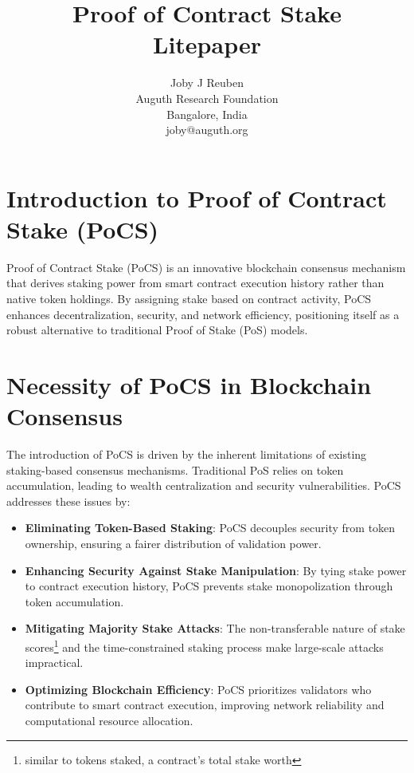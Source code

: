 \documentclass{article}
\begin{document}
\title{Proof of Contract Stake \\ Litepaper}

\author{Joby J Reuben \\
Auguth Research Foundation \\
Bangalore, India \\
joby@auguth.org
}

\maketitle

\section{Introduction to Proof of Contract Stake (PoCS)}

Proof of Contract Stake (PoCS) is an innovative blockchain consensus mechanism that derives staking power from smart contract execution history rather than native token holdings. By assigning stake based on contract activity, PoCS enhances decentralization, security, and network efficiency, positioning itself as a robust alternative to traditional Proof of Stake (PoS) models.

\section{Necessity of PoCS in Blockchain Consensus}

The introduction of PoCS is driven by the inherent limitations of existing staking-based consensus mechanisms. Traditional PoS relies on token accumulation, leading to wealth centralization and security vulnerabilities. PoCS addresses these issues by:

\begin{itemize}
    \item \textbf{Eliminating Token-Based Staking}: PoCS decouples security from token ownership, ensuring a fairer distribution of validation power.
    \item \textbf{Enhancing Security Against Stake Manipulation}: By tying stake power to contract execution history, PoCS prevents stake monopolization through token accumulation.
    \item \textbf{Mitigating Majority Stake Attacks}: The non-transferable nature of stake scores\footnote{similar to tokens staked, a contract's total stake worth} and the time-constrained staking process make large-scale attacks impractical.
    \item \textbf{Optimizing Blockchain Efficiency}: PoCS prioritizes validators who contribute to smart contract execution, improving network reliability and computational resource allocation.
\end{itemize}
\end{document}

